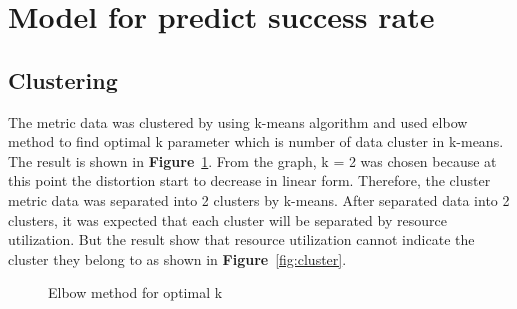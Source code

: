 \documentclass[12pt,oneside,openright,a4paper]{cpe-english-project}
\begin{document}
\newpage

\section{Model for predict success rate}
\subsection{Clustering}  
\hspace{10mm}The metric data was clustered by using k-means algorithm and used elbow method to find optimal k parameter which is number of data cluster in k-means. The result is shown in \textbf{Figure}~\ref{fig:elbow}. From the graph, k = 2 was chosen because at this point the distortion start to decrease in linear form. Therefore, the cluster metric data was separated into 2 clusters by k-means. After separated data into 2 clusters, it was expected that each cluster will be separated by resource utilization. But the result show that resource utilization cannot indicate the cluster they belong to as shown in \textbf{Figure}~\ref{fig:cluster}. 
\begin{figure}[!h]\centering
    \setlength{\fboxrule}{0mm} %
    \setlength{\fboxsep}{0cm}
    \caption{Elbow method for optimal k}\label{fig:elbow}
\end{figure}
\end{document}
